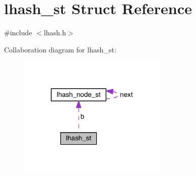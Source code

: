 \hypertarget{structlhash__st}{}\section{lhash\+\_\+st Struct Reference}
\label{structlhash__st}


{\ttfamily \#include $<$lhash.\+h$>$}



Collaboration diagram for lhash\+\_\+st\+:\nopagebreak
\begin{figure}[H]
\begin{center}
\leavevmode
\includegraphics[width=201pt]{structlhash__st__coll__graph}
\end{center}
\end{figure}
